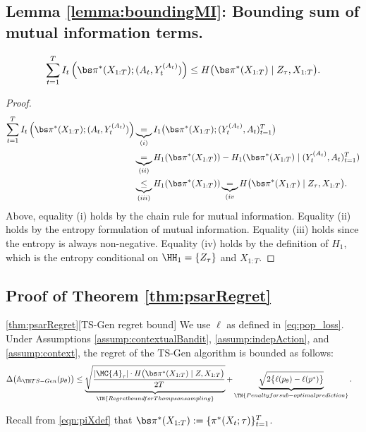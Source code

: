 \subsection{Lemma \ref{lemma:boundingMI}: Bounding sum of mutual information terms.}
\begin{lemma}
    \label{lemma:boundingMI}
    \[
    \sum_{t=1}^T I_t \left( \piX; (A_t, Y_t^{(A_t)}) \right)
    \leq H \big( \piX \mid Z_{\tau}, X_{1:T} \big). 
    \]
\end{lemma}
\begin{proof}
\begin{align*}
    \sum_{t=1}^T I_t \left( \piX; (A_t, Y_t^{(A_t)}) \right)
    &\underbrace{=}_{(i)} I_1 \big( \piX; ( Y_t^{(A_t)}, A_t )_{t=1}^T \big) \\
    &\underbrace{=}_{(ii)} H_1(\piX) - H_1(\piX \mid ( Y_t^{(A_t)}, A_t )_{t=1}^T) \\
    &\underbrace{\leq}_{(iii)} H_1(\piX) \underbrace{=}_{(iv} H \big( \piX \mid Z_{\tau}, X_{1:T} \big).
\end{align*}
Above, equality (i) holds by the chain rule for mutual information. Equality (ii) holds by the entropy formulation of mutual information. Equality (iii) holds since the entropy is always non-negative. Equality (iv) holds by the definition of $H_1$, which is the entropy conditional on $\HH_1 = \{ Z_{\tau} \}$ and $X_{1:T}$.
\end{proof}


\subsection{Proof of Theorem \ref{thm:psarRegret}}
\begin{customthm}{\ref{thm:psarRegret}}[TS-Gen regret bound]
We use $\ell$ as defined in \eqref{eq:pop_loss}. Under Assumptions \ref{assump:contextualBandit}, \ref{assump:indepAction}, and \ref{assump:context}, the regret of the TS-Gen algorithm is bounded as follows:
    \begin{align*}
      \Delta \big( \psar(p_\theta) \big)
      & \leq 
        \underbrace{ \sqrt{ \frac{ |\MC{A}_{\tau}| \cdot H \big( \piX \mid Z, X_{1:T} \big) }{2 T} } }_{\TN{Regret bound for Thompson sampling}} 
        + \underbrace{ \sqrt{ 2 \big\{ \ell(p_\theta) - \ell(p^*) \big\} } }_{\TN{Penalty for sub-optimal prediction}}.
    \end{align*}
\end{customthm}
Recall from \eqref{eqn:piXdef} that $\piX := \{ \pi^*(X_t; \tau) \}_{t=1}^T$.

